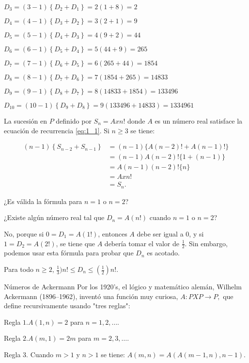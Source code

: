 \begin{example}{}
$D_{3}=\left(3-1\right)\left\{D_{2}+D_{1}\right\}=2\left(1+8\right)=2$

$D_{4}=\left(4 - 1\right)\left\{D_{3}+D_{2}\right\}=3\left(2+1\right)=9$

$D_{5}=\left(5-1\right)\left\{D_{4}+D_{3}\right\}=4\left(9+2\right)=44$

$D_{6}=(6-1)\left\{D_{5}+D_{4}\right\}=5\left(44 + 9\right)=265$

$D_{7}=\left(7-1\right)\left\{D_{6}+D_{5}\right\}=6\left(265+44\right)=1854$

$D_{8}=\left(8-1\right)\left\{D_{7}+D_{6}\right\}=7\left(1854+265\right)=14833$

$D_{9}=\left(9-1\right)\left\{D_{8}+D_{7}\right\}=8\left(14833+1854\right)=133496$

$D_{10}=\left(10-1\right)\left\{D_{9}+D_{8}\right\}=9\left(133496+14833\right)=1334961$

La sucesión en $P$ definido por $S_{n} = Axn!$ donde $A$ es un número real satisface la ecuación de recurrencia \eqref{eq:1_1}. Si $n\geq3$ se tiene:

\begin{align*}
	\left(n-1\right)\left\{S_{n-2}+S_{n-1}\right\}
	&=(n-1)\{A(n-2)! + A(n-1)!\} \\
	&= (n-1)A(n-2)!\{1+(n-1)\} \\
	&= A(n-1)(n-2)!\{n\}\\
	&= A x n!\\
	&= S_{n}.
\end{align*}

¿Es válida la fórmula para $n=1$ o $n=2$?

¿Existe algún número real tal que $D_{n}=A(n!)$ cuando $n=1$ o $n=2$?

No, porque si $0=D_{1}=A(1!)$, entonces $A$ debe ser igual a $0$, y si $1=D_{2}=A(2!)$, se tiene que $A$ debería tomar el valor de $\frac{1}{2}$. Sin embargo, podemos usar esta fórmula para probar que $D_{n}$ es acotado.
\end{example}

\begin{theorem}{}
Para todo $n\geq 2$, $\frac{1}{3})n!\leq D_{n}\leq\left(\frac{1}{2}\right)n!$.
\end{theorem}

\begin{example}{Números de Ackermann}
	Por los 1920's, el lógico y matemático alemán, Wilhelm Ackermann (1896–1962), inventó una función muy curiosa, $A\colon PXP\longrightarrow P,$ que define recursivamente usando "tres reglas":
	
	Regla $1$.$A(1,n)=2$ para $n=1,2,\ldots$.
	
	Regla $2$.$A(m,1)=2m$ para $m=2,3,\ldots$.
	
	Regla $3$. Cuando $m>1$ y $n>1$ se tiene: $A(m,n)=A(A(m-1,n),n-1)$.
\end{example}

